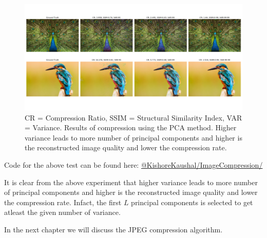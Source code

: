 \begin{figure}[!ht]
    \centering
    \includegraphics[width=1\textwidth]{fig/2-4.png}
    \caption{CR = Compression Ratio, SSIM = Structural Similarity Index, VAR = Variance. Results of compression using the PCA method. Higher variance leads to more number of principal components and higher is the reconstructed image quality and lower the compression rate.}
    \label{fig:imageCompressionUsingPCA}
\end{figure}

Code for the above test can be found here: \href{https://github.com/KishoreKaushal/ImageCompression/tree/master/PCA}{@KishoreKaushal/ImageCompression/}

It is clear from the above experiment that higher variance leads to more number of principal components and higher is the reconstructed image quality and lower the compression rate. Infact, the first $L$ principal components is selected to get atleast the given number of variance.

In the next chapter we will discuss the JPEG compression algorithm.